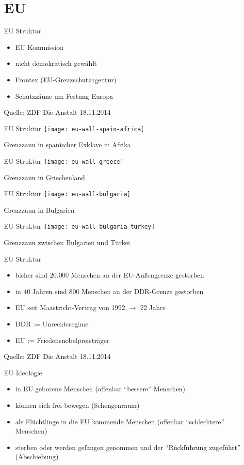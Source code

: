 \documentclass{beamer}
\begin{document}
	\section{EU}
	\begin{frame}{EU Struktur}
		\begin{itemize}
			\item EU Kommission
			\item nicht demokratisch gewählt
			\item Frontex (EU-Grenzschutzagentur)
			\item Schutzzäune um Festung Europa
		\end{itemize}
		
		Quelle: ZDF Die Anstalt 18.11.2014
	\end{frame}
	\begin{frame}{EU Struktur}
		\centering
		\texttt{[image: eu-wall-spain-africa]}
		
		Grenzzaun in spanischer Exklave in Afrika
	\end{frame}
	\begin{frame}{EU Struktur}
		\centering
		\texttt{[image: eu-wall-greece]}
		
		Grenzzaun in Griechenland
	\end{frame}
	\begin{frame}{EU Struktur}
		\centering
		\texttt{[image: eu-wall-bulgaria]}
		
		Grenzzaun in Bulgarien
	\end{frame}
	\begin{frame}{EU Struktur}
		\centering
		\texttt{[image: eu-wall-bulgaria-turkey]}
		
		Grenzzaun zwischen Bulgarien und Türkei
	\end{frame}
	\begin{frame}{EU Struktur}
		\begin{itemize}
			\item bisher sind 20.000 Menschen an der EU-Außengrenze gestorben
			\item in 40 Jahren sind 800 Menschen an der DDR-Grenze gestorben
			\item<2-> EU seit Maastricht-Vertrag von 1992 \(\rightarrow\) 22 Jahre
			\item<3-> DDR := Unrechtsregime
			\item<4-> EU := Friedensnobelpreisträger
		\end{itemize}
		
		Quelle: ZDF Die Anstalt 18.11.2014
	\end{frame}
	\begin{frame}{EU Ideologie}
		\begin{itemize}
			\item in EU geborene Menschen (offenbar "`bessere"' Menschen)
			\item können sich frei bewegen (Schengenraum)
			\item als Flüchtlinge in die EU kommende Menschen (offenbar "`schlechtere"' Menschen)
			\item sterben oder werden gefangen genommen und der "`Rückführung zugeführt"' (Abschiebung)
		\end{itemize}
	\end{frame}
	
\end{document}
